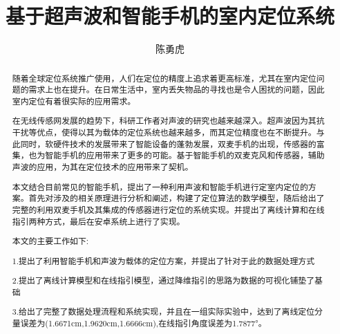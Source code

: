 \documentclass[winfonts]{njuthesis}
\title{基于超声波和智能手机的室内定位系统}
\author{陈勇虎}
\begin{document}
\maketitle

\begin{abstract}
	
	随着全球定位系统推广使用，人们在定位的精度上追求着更高标准，尤其在室内定位问题的需求上也在提升。在日常生活中，室内丢失物品的寻找也是令人困扰的问题，因此室内定位有着很实际的应用需求。
	
	在无线传感网发展的趋势下，科研工作者对声波的研究也越来越深入。超声波因为其抗干扰等优点，使得以其为载体的定位系统也越来越多，而其定位精度也在不断提升。与此同时，软硬件技术的发展带来了智能设备的蓬勃发展，双麦手机的出现，传感器的富集，也为智能手机的应用带来了更多的可能。基于智能手机的双麦克风和传感器，辅助声波的应用，为其在定位技术的应用带来了契机。
	
	本文结合目前常见的智能手机，提出了一种利用声波和智能手机进行定室内定位的方案。首先对涉及的相关原理进行分析和阐述，构建了定位算法的数学模型，随后给出了完整的利用双麦手机及其集成的传感器进行定位的系统实现。并提出了离线计算和在线指引两种方式，最后在安卓系统上进行了实现。
	
	本文的主要工作如下:
	
	1.提出了利用智能手机和声波为载体的定位方案，并提出了针对于此的数据处理方式
	
	2.提出了离线计算模型和在线指引模型，通过降维指引的思路为数据的可视化铺垫了基础
	
	3.给出了完整了数据处理流程和系统实现，并且在一组实际实验中，达到了离线定位分量误差为(1.6671cm,1.9620cm,1.6666cm),在线指引角度误差为1.7877°。

\end{abstract}

\begin{englishabstract}


\end{englishabstract}
\end{document}
